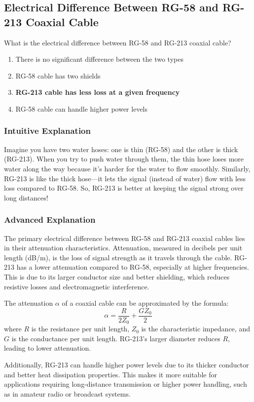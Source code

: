 \subsection{Electrical Difference Between RG-58 and RG-213 Coaxial Cable}
\label{T9B10}

\begin{tcolorbox}[colback=gray!10!white,colframe=black!75!black,title=T9B10]
What is the electrical difference between RG-58 and RG-213 coaxial cable?
\begin{enumerate}[label=\Alph*)]
    \item There is no significant difference between the two types
    \item RG-58 cable has two shields
    \item \textbf{RG-213 cable has less loss at a given frequency}
    \item RG-58 cable can handle higher power levels
\end{enumerate}
\end{tcolorbox}

\subsubsection{Intuitive Explanation}
Imagine you have two water hoses: one is thin (RG-58) and the other is thick (RG-213). When you try to push water through them, the thin hose loses more water along the way because it’s harder for the water to flow smoothly. Similarly, RG-213 is like the thick hose—it lets the signal (instead of water) flow with less loss compared to RG-58. So, RG-213 is better at keeping the signal strong over long distances!

\subsubsection{Advanced Explanation}
The primary electrical difference between RG-58 and RG-213 coaxial cables lies in their attenuation characteristics. Attenuation, measured in decibels per unit length (dB/m), is the loss of signal strength as it travels through the cable. RG-213 has a lower attenuation compared to RG-58, especially at higher frequencies. This is due to its larger conductor size and better shielding, which reduces resistive losses and electromagnetic interference.

The attenuation \( \alpha \) of a coaxial cable can be approximated by the formula:
\[
\alpha = \frac{R}{2Z_0} + \frac{G Z_0}{2}
\]
where \( R \) is the resistance per unit length, \( Z_0 \) is the characteristic impedance, and \( G \) is the conductance per unit length. RG-213’s larger diameter reduces \( R \), leading to lower attenuation.

Additionally, RG-213 can handle higher power levels due to its thicker conductor and better heat dissipation properties. This makes it more suitable for applications requiring long-distance transmission or higher power handling, such as in amateur radio or broadcast systems.

